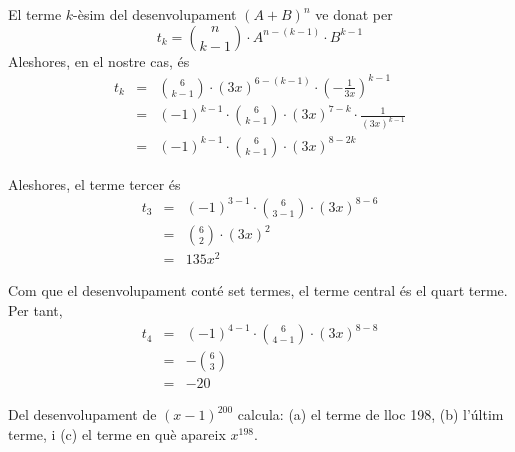 \begin{solucio}
El terme $k$-èsim del desenvolupament $(A+B)^{n}$ ve donat per\[
t_{k}=\binom{n}{k-1}\cdot A^{n-(k-1)}\cdot B^{k-1}
\]Aleshores, en el nostre cas, és\begin{eqnarray*}
t_{k} &=&\binom{6}{k-1}\cdot \left( 3x\right) ^{6-(k-1)}\cdot \left( -\frac{1}{3x}\right) ^{k-1} \\
&=&(-1)^{k-1}\cdot \binom{6}{k-1}\cdot \left( 3x\right) ^{7-k}\cdot \frac{1}{\left( 3x\right) ^{k-1}} \\
&=&(-1)^{k-1}\cdot \binom{6}{k-1}\cdot \left( 3x\right) ^{8-2k}
\end{eqnarray*}

Aleshores, el terme tercer és\begin{eqnarray*}
t_{3} &=&(-1)^{3-1}\cdot \binom{6}{3-1}\cdot \left( 3x\right) ^{8-6} \\
&=&\binom{6}{2}\cdot \left( 3x\right) ^{2} \\
&=&135x^{2}
\end{eqnarray*}

Com que el desenvolupament conté set termes, el terme central
és el quart terme. Per tant,
\begin{eqnarray*}
t_{4} &=&(-1)^{4-1}\cdot \binom{6}{4-1}\cdot \left( 3x\right) ^{8-8} \\
&=&-\binom{6}{3} \\
&=&-20
\end{eqnarray*}
\end{solucio}

\begin{exercici}
Del desenvolupament de $(x-1)^{200}$ calcula: (a) el terme de lloc 198,
(b) l'últim terme, i (c) el terme en què apareix $x^{198}$.
\end{exercici}

